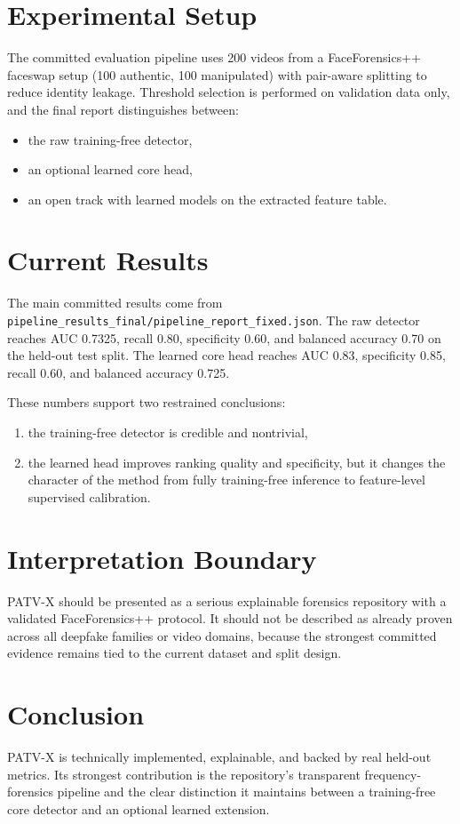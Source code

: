 \documentclass[conference]{IEEEtran}
\begin{document}
\section{Experimental Setup}
The committed evaluation pipeline uses 200 videos from a FaceForensics++ faceswap setup (100 authentic, 100 manipulated) with pair-aware splitting to reduce identity leakage. Threshold selection is performed on validation data only, and the final report distinguishes between:
\begin{itemize}
\item the raw training-free detector,
\item an optional learned core head,
\item an open track with learned models on the extracted feature table.
\end{itemize}

\section{Current Results}
The main committed results come from \texttt{pipeline\_results\_final/pipeline\_report\_fixed.json}. The raw detector reaches AUC 0.7325, recall 0.80, specificity 0.60, and balanced accuracy 0.70 on the held-out test split. The learned core head reaches AUC 0.83, specificity 0.85, recall 0.60, and balanced accuracy 0.725.

These numbers support two restrained conclusions:
\begin{enumerate}
\item the training-free detector is credible and nontrivial,
\item the learned head improves ranking quality and specificity, but it changes the character of the method from fully training-free inference to feature-level supervised calibration.
\end{enumerate}

\section{Interpretation Boundary}
PATV-X should be presented as a serious explainable forensics repository with a validated FaceForensics++ protocol. It should not be described as already proven across all deepfake families or video domains, because the strongest committed evidence remains tied to the current dataset and split design.

\section{Conclusion}
PATV-X is technically implemented, explainable, and backed by real held-out metrics. Its strongest contribution is the repository's transparent frequency-forensics pipeline and the clear distinction it maintains between a training-free core detector and an optional learned extension.



\end{document}
